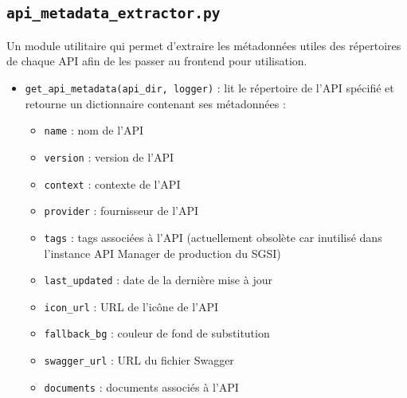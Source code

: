 \subsection{\texttt{api\_metadata\_extractor.py}}
Un module utilitaire qui permet d'extraire les métadonnées utiles des répertoires de chaque API afin de les passer au frontend pour utilisation.

\begin{itemize}
    \item[$\bullet$] \texttt{get\_api\_metadata(api\_dir, logger)} : lit le répertoire de l'API spécifié et retourne un dictionnaire contenant ses métadonnées :
    \begin{itemize}
        \item[$\circ$] \texttt{name} : nom de l'API
        \item[$\circ$] \texttt{version} : version de l'API
        \item[$\circ$] \texttt{context} : contexte de l'API
        \item[$\circ$] \texttt{provider} : fournisseur de l'API
        \item[$\circ$] \texttt{tags} : tags associées à l'API (actuellement obsolète car inutilisé dans l'instance API Manager de production du SGSI)
        \item[$\circ$] \texttt{last\_updated} : date de la dernière mise à jour
        \item[$\circ$] \texttt{icon\_url} : URL de l'icône de l'API
        \item[$\circ$] \texttt{fallback\_bg} : couleur de fond de substitution
        \item[$\circ$] \texttt{swagger\_url} : URL du fichier Swagger
        \item[$\circ$] \texttt{documents} : documents associés à l'API
    \end{itemize}
\end{itemize}
